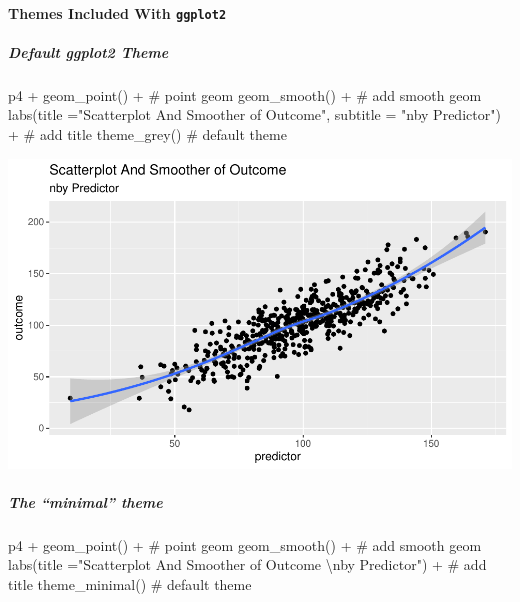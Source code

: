 \documentclass[12pt,]{article}
\newenvironment{Shaded}{}{}
\newcommand{\CharTok}[1]{\textcolor[rgb]{0.00,0.50,0.50}{#1}}
\newcommand{\CommentTok}[1]{\textcolor[rgb]{0.00,0.50,0.00}{#1}}
\newcommand{\DataTypeTok}[1]{#1}
\newcommand{\KeywordTok}[1]{\textcolor[rgb]{0.00,0.00,1.00}{#1}}
\newcommand{\NormalTok}[1]{#1}
\newcommand{\OperatorTok}[1]{#1}
\newcommand{\StringTok}[1]{\textcolor[rgb]{0.00,0.50,0.50}{#1}}
\let\oldparagraph\paragraph
\renewcommand{\paragraph}[1]{\oldparagraph{#1}\mbox{}}
\let\oldsubparagraph\subparagraph
\renewcommand{\subparagraph}[1]{\oldsubparagraph{#1}\mbox{}}
\begin{document}
\hypertarget{themes-included-with-ggplot2}{%
\paragraph{\texorpdfstring{Themes Included With
\texttt{ggplot2}}{Themes Included With ggplot2}}\label{themes-included-with-ggplot2}}

\hypertarget{default-ggplot2-theme}{%
\subparagraph{Default ggplot2 Theme}\label{default-ggplot2-theme}}

\begin{Shaded}
\begin{Highlighting}[]
\NormalTok{p4 }\OperatorTok{+}\StringTok{ }
\StringTok{  }\KeywordTok{geom_point}\NormalTok{() }\OperatorTok{+}\StringTok{ }\CommentTok{# point geom}
\StringTok{  }\KeywordTok{geom_smooth}\NormalTok{() }\OperatorTok{+}\StringTok{ }\CommentTok{# add smooth geom}
\StringTok{  }\KeywordTok{labs}\NormalTok{(}\DataTypeTok{title =}\StringTok{"Scatterplot And Smoother of Outcome"}\NormalTok{, }
       \DataTypeTok{subtitle =} \StringTok{"nby Predictor"}\NormalTok{) }\OperatorTok{+}\StringTok{ }\CommentTok{# add title}
\StringTok{  }\KeywordTok{theme_grey}\NormalTok{() }\CommentTok{# default theme}
\end{Highlighting}
\end{Shaded}

\includegraphics{introduction-to-ggplot2_files/figure-latex/unnamed-chunk-24-1.pdf}

\hypertarget{the-minimal-theme}{%
\subparagraph{The ``minimal'' theme}\label{the-minimal-theme}}

\begin{Shaded}
\begin{Highlighting}[]
\NormalTok{p4 }\OperatorTok{+}\StringTok{ }
\StringTok{  }\KeywordTok{geom_point}\NormalTok{() }\OperatorTok{+}\StringTok{ }\CommentTok{# point geom}
\StringTok{  }\KeywordTok{geom_smooth}\NormalTok{() }\OperatorTok{+}\StringTok{ }\CommentTok{# add smooth geom}
\StringTok{  }\KeywordTok{labs}\NormalTok{(}\DataTypeTok{title =}\StringTok{"Scatterplot And Smoother of Outcome }\CharTok{\textbackslash{}n}\StringTok{by Predictor"}\NormalTok{) }\OperatorTok{+}\StringTok{ }\CommentTok{# add title}
\StringTok{  }\KeywordTok{theme_minimal}\NormalTok{() }\CommentTok{# default theme}
\end{Highlighting}
\end{Shaded}
\end{document}
